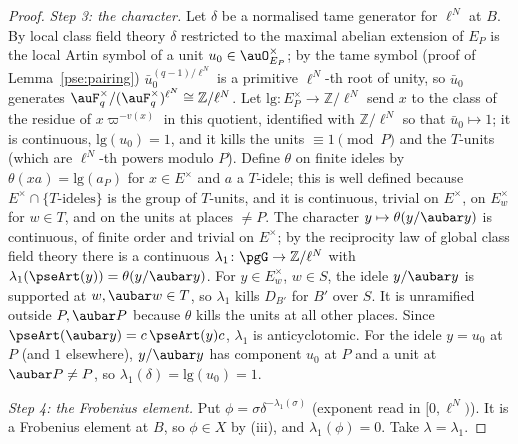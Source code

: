 \documentclass[10pt]{amsart}
\theoremstyle{definition}
\theoremstyle{remark}
\newcommand{\Z}{\mathbb Z}
\begin{document}
\begin{proof}
\emph{Step 3: the character.} Let $\delta$ be a normalised tame generator for $\ell^N$ at $B$. By
local class field theory $\delta$ restricted to the maximal abelian extension of $E_P$ is the local
Artin symbol of a unit $u_0\in\auO_{E_P}^\times$; by the tame symbol (proof of
Lemma~\ref{pse:pairing}) $\bar u_0^{(q-1)/\ell^N}$ is a primitive $\ell^N$-th root of unity, so $\bar
u_0$ generates $\auF_q^\times/(\auF_q^\times)^{\ell^N}\cong\Z/\ell^N$. Let $\mathrm{lg}\colon
E_P^\times\to\Z/\ell^N$ send $x$ to the class of the residue of $x\varpi^{-v(x)}$ in this quotient,
identified with $\Z/\ell^N$ so that $\bar u_0\mapsto1$; it is continuous, $\mathrm{lg}
(u_0)=1$, and it kills the units $\equiv1\pmod P$ and the $T$-units (which are $\ell^N$-th powers
modulo $P$). Define $\theta$ on finite ideles by $\theta(xa)=\mathrm{lg}(a_P)$ for $x\in E^\times$ and
$a$ a $T$-idele; this is well defined because $E^\times\cap\{T\text{-ideles}\}$ is the group of
$T$-units, and it is continuous, trivial on $E^\times$, on $E_w^\times$ for $w\in T$, and on the
units at places $\ne P$. The character $y\mapsto\theta(y/\aubar y)$ is continuous, of finite order
and trivial on $E^\times$; by the reciprocity law of global class field theory there is a continuous
$\lambda_1\colon\pgG\to\Z/\ell^N$ with $\lambda_1(\pseArt(y))=\theta(y/\aubar y)$. For $y\in
E_w^\times$, $w\in S$, the idele $y/\aubar y$ is supported at $w,\aubar w\in T$, so $\lambda_1$ kills
$D_{B'}$ for $B'$ over $S$. It is unramified outside $P,\aubar P$ because $\theta$ kills the units at
all other places. Since $\pseArt(\aubar y)=c\,\pseArt(y)c$, $\lambda_1$ is anticyclotomic. For the idele
$y=u_0$ at $P$ (and $1$ elsewhere), $y/\aubar y$ has component $u_0$ at $P$ and a unit at $\aubar P\ne
P$, so $\lambda_1(\delta)=\mathrm{lg}(u_0)=1$.

\emph{Step 4: the Frobenius element.} Put $\phi=\sigma\delta^{-\lambda_1(\sigma)}$ (exponent read in
$[0,\ell^N)$). It is a Frobenius element at $B$, so $\phi\in X$ by (iii), and $\lambda_1(\phi)=0$.
Take $\lambda=\lambda_1$.
\end{proof}
\end{document}
